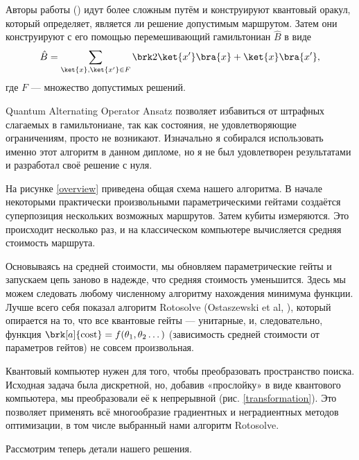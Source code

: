 Авторы работы \cite{oracle} (\citeyear{oracle}) идут более сложным путём и конструируют квантовый оракул, который определяет, является ли решение допустимым маршрутом. Затем они конструируют с его помощью перемешивающий гамильтониан $\hat B$ в виде
$$
\hat B = \sum_{\ket{x}, \ket{x'} \in F} \brk2{\ket{x'}\bra{x} + \ket{x}\bra{x'}},
$$
где $F$ --- множество допустимых решений.

Quantum Alternating Operator Ansatz позволяет избавиться от штрафных слагаемых в гамильтониане, так как состояния, не удовлетворяющие ограничениям, просто не возникают. Изначально я собирался использовать именно этот алгоритм в данном дипломе, но я не был удовлетворен результатами и разработал своё решение с нуля.


На рисунке \ref{overview} приведена общая схема нашего алгоритма. В начале некоторыми практически произвольными параметрическими гейтами создаётся суперпозиция нескольких возможных маршрутов. Затем кубиты измеряются. Это происходит несколько раз, и на классическом компьютере вычисляется средняя стоимость маршрута.


Основываясь на средней стоимости, мы обновляем параметрические гейты и запускаем цепь заново в надежде, что средняя стоимость уменьшится. Здесь мы можем следовать любому численному алгоритму нахождения минимума функции. 
Лучше всего себя показал алгоритм Rotosolve 
(Ostaszewski et al, ),
который опирается на то, что все квантовые гейты --- унитарные, и, следовательно, функция $\brk[a]{\text{cost}} = f(\theta_1, \theta_2 \dots)$ (зависимость средней стоимости от параметров гейтов) не совсем произвольная.

Квантовый компьютер нужен для того, чтобы преобразовать пространство поиска. Исходная задача была дискретной, но, добавив «прослойку» в виде квантового компьютера, мы преобразовали её к непрерывной (рис. \ref{transformation}). Это позволяет применять всё многообразие градиентных и неградиентных методов оптимизации, в том числе выбранный нами алгоритм Rotosolve.



Рассмотрим теперь детали нашего решения.



